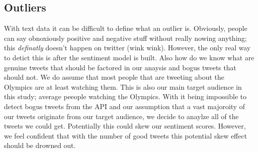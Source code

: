 \documentclass[12pt]{article}
\begin{document}
        \subsection{Outliers}
            With text data it can be difficult to define what an outlier is. Obviously, people can say obnoxiously positive and negative stuff without really nowing anything; this 
            \textit{definatly} doesn't happen on twitter (wink wink). However, the only real way to detict this is after the sentiment model is built. Also how do we know what are 
            genuine tweets that should be factored in our anaysis and bogus tweets that should not. We do assume that most people that are tweeting about the Olympics are at least 
            watching them. This is also our main target audience in this study; average peeople watching the Olympics. With it being impossible to detect bogus tweets from the API 
            and our assumption that a vast majoroity of our tweets originate from our target audience, we decide to anaylze all of the tweets we could get. Potentially this could skew
             our sentiment scores. However, we feel confident that with the number of good tweets this potential skew effect should be drowned out.
\end{document}
